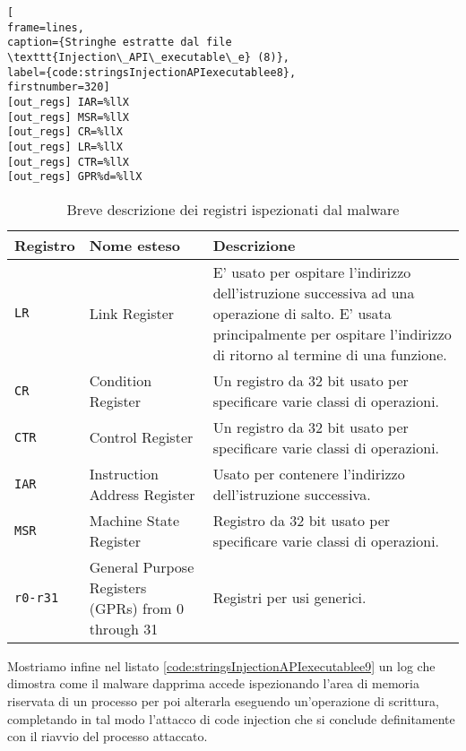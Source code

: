 \documentclass[10pt,a4paper, titlepage]{report}
\begin{document}
\begin{lstlisting}[
frame=lines, 
caption={Stringhe estratte dal file \texttt{Injection\_API\_executable\_e} (8)}, 
label={code:stringsInjectionAPIexecutablee8},
firstnumber=320]
[out_regs] IAR=%llX
[out_regs] MSR=%llX
[out_regs] CR=%llX
[out_regs] LR=%llX
[out_regs] CTR=%llX
[out_regs] GPR%d=%llX
\end{lstlisting}

\begin{table}[h!]
    \caption{Breve descrizione dei registri ispezionati dal malware}
    \centering
    \begin{adjustbox}{center=\textwidth}
    \label{tab:PowerPCRegister}
    
    \begin{tabular}{l|l|p{8cm}}
      \toprule
      Registro & Nome esteso & Descrizione \\
      \midrule
      \texttt{LR} & Link Register & E' usato per ospitare l'indirizzo dell'istruzione successiva ad una operazione di salto. E' usata principalmente per ospitare l'indirizzo di ritorno al termine di una funzione. \\
      
      \texttt{CR} & Condition Register & Un registro da 32 bit usato per specificare varie classi di operazioni.\\
      
      \texttt{CTR} & Control Register & Un registro da 32 bit usato per specificare varie classi di operazioni.\\
      
      \texttt{IAR} & Instruction Address Register & Usato per contenere l'indirizzo dell'istruzione successiva.\\
      
      \texttt{MSR} & Machine State Register & Registro da 32 bit usato per specificare varie classi di operazioni.\\
     
	\texttt{r0-r31} & General Purpose Registers (GPRs) from 0 through 31 & Registri per usi generici. \\   
     
      \bottomrule
    \end{tabular}
    \end{adjustbox}
\end{table}

Mostriamo infine nel listato \ref{code:stringsInjectionAPIexecutablee9} un log che dimostra come il malware dapprima accede ispezionando l'area di memoria riservata di un processo per poi alterarla eseguendo un'operazione di scrittura, completando in tal modo l'attacco di code injection che si conclude definitamente con il riavvio del processo attaccato.
\end{document}
